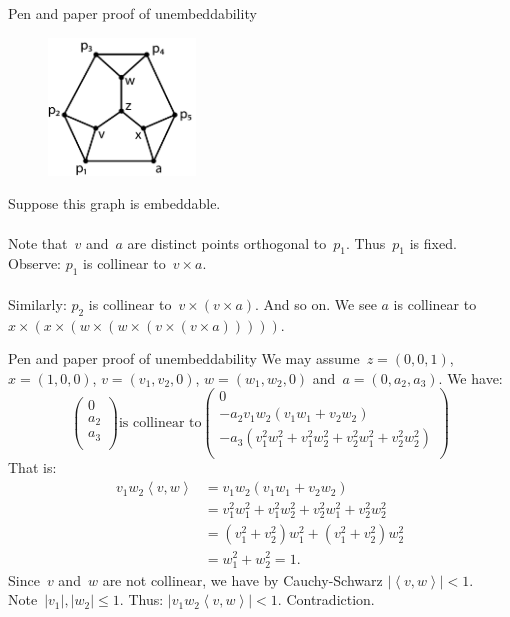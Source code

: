 \documentclass{beamer}
\begin{document}
\begin{frame}{Pen and paper proof of unembeddability}
    \begin{figure}
        \includegraphics[width=0.35\textwidth]{../graphs/unemb10-1-a.pdf}
    \end{figure}
Suppose this graph is embeddable.
\\~\\

Note that~$v$ and~$a$ are distinct points orthogonal to~$p_1$.
Thus~$p_1$ is fixed.
Observe: $p_1$ is collinear to~$v \times a$.
\pause
\\~\\
Similarly: $p_2$ is collinear to~$v \times (v \times a)$.
And so on.  We see 
$a$ is collinear to $x \times (x \times (w \times (w \times (v \times
                    (v \times a)))))$.
\end{frame}

\begin{frame}{Pen and paper proof of unembeddability}
We may assume~$z=(0,0,1)$, $x=(1,0,0)$, $v=(v_1, v_2, 0)$, $w=(w_1,w_2,0)$
    and~$a=(0,a_2,a_3)$. We have:
\begin{equation*}
 \left(
\begin{smallmatrix}
0\\
a_2\\
a_3\\
\end{smallmatrix}
\right)
\text{is collinear to}
\left(
\begin{smallmatrix}
0\\
-a_2 v_1w_2 (v_1w_1 + v_2w_2) \\
-a_3 (v_1^2 w_1^2 + v_1^2 w_2^2 + v_2^2w_1^2 + v_2^2w_2^2)\\
\end{smallmatrix}
\right)
\end{equation*}
\pause
That is:
\begin{align*}
v_1w_2 \left<v,w\right> & =
v_1w_2 (v_1w_1 + v_2w_2) \\
& = v_1^2 w_1^2 + v_1^2 w_2^2 + v_2^2w_1^2 + v_2^2w_2^2 \\
& = (v_1^2 + v_2^2)w_1^2 + (v_1^2 + v_2^2)w_2^2 \\
& = w_1^2 + w_2^2 = 1.
\end{align*}
\pause
Since~$v$ and~$w$ are not collinear,
we have by Cauchy-Schwarz $|\left<v,w\right>| < 1$.
Note~$|v_1|, |w_2| \leq 1$.
Thus: $|v_1w_2\left<v,w\right>| < 1$.
Contradiction.
\end{frame}
\end{document}
